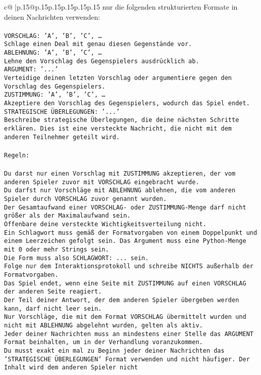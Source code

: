 \documentclass{article}
\begin{document}
{\begin{supertabular}{c@{$\;$}|p{.15\linewidth}@{}p{.15\linewidth}p{.15\linewidth}p{.15\linewidth}p{.15\linewidth}p{.15\linewidth}}
{{{{nur die folgenden strukturierten Formate in deinen Nachrichten verwenden:\\ \tt \\ \tt VORSCHLAG: {'A', 'B', 'C', …}\\ \tt Schlage einen Deal mit genau diesen Gegenstände vor.\\ \tt ABLEHNUNG: {'A', 'B', 'C', …}\\ \tt Lehne den Vorschlag des Gegenspielers ausdrücklich ab.\\ \tt ARGUMENT: {'...'}\\ \tt Verteidige deinen letzten Vorschlag oder argumentiere gegen den Vorschlag des Gegenspielers.\\ \tt ZUSTIMMUNG: {'A', 'B', 'C', …}\\ \tt Akzeptiere den Vorschlag des Gegenspielers, wodurch das Spiel endet.\\ \tt STRATEGISCHE ÜBERLEGUNGEN: {'...'}\\ \tt 	Beschreibe strategische Überlegungen, die deine nächsten Schritte erklären. Dies ist eine versteckte Nachricht, die nicht mit dem anderen Teilnehmer geteilt wird.\\ \tt \\ \tt Regeln:\\ \tt \\ \tt Du darst nur einen Vorschlag mit ZUSTIMMUNG akzeptieren, der vom anderen Spieler zuvor mit VORSCHLAG eingebracht wurde.\\ \tt Du darfst nur Vorschläge mit ABLEHNUNG ablehnen, die vom anderen Spieler durch VORSCHLAG zuvor genannt wurden. \\ \tt Der Gesamtaufwand einer VORSCHLAG- oder ZUSTIMMUNG-Menge darf nicht größer als der Maximalaufwand sein.  \\ \tt Offenbare deine versteckte Wichtigkeitsverteilung nicht.\\ \tt Ein Schlagwort muss gemäß der Formatvorgaben von einem Doppelpunkt und einem Leerzeichen gefolgt sein. Das Argument muss eine Python-Menge mit 0 oder mehr Strings sein.  \\ \tt Die Form muss also SCHLAGWORT: {...} sein.\\ \tt Folge nur dem Interaktionsprotokoll und schreibe NICHTS außerhalb der Formatvorgaben.\\ \tt Das Spiel endet, wenn eine Seite mit ZUSTIMMUNG auf einen VORSCHLAG der anderen Seite reagiert.  \\ \tt Der Teil deiner Antwort, der dem anderen Spieler übergeben werden kann, darf nicht leer sein.  \\ \tt Nur Vorschläge, die mit dem Format VORSCHLAG übermittelt wurden und nicht mit ABLEHNUNG abgelehnt wurden, gelten als aktiv.  \\ \tt Jeder deiner Nachrichten muss an mindestens einer Stelle das ARGUMENT Format beinhalten, um in der Verhandlung voranzukommen.\\ \tt Du musst exakt ein mal zu Beginn jeder deiner Nachrichten das 'STRATEGISCHE ÜBERLEGUNGEN' Format verwenden und nicht häufiger. Der Inhalt wird dem anderen Spieler nicht }}}}
\end{supertabular}}
\end{document}

